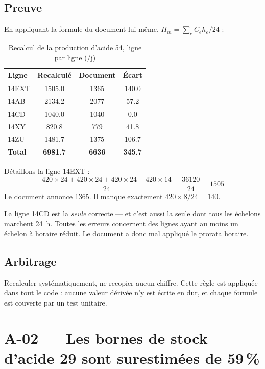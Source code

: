 \subsection{Preuve}

En appliquant la formule du document lui-même, $\Pi_m = \sum_e C_e h_e / 24$ :

\begin{table}[H]
\centering
\caption{Recalcul de la production d'acide 54, ligne par ligne (\tP/j)}
\label{tab:recalcul-p54}
\begin{tabular}{@{}lS[table-format=4.1]S[table-format=4.0]S[table-format=3.1]@{}}
\toprule
\textbf{Ligne} & {\textbf{Recalculé}} & {\textbf{Document}} & {\textbf{Écart}} \\
\midrule
14EXT & 1505.0 & 1365 & 140.0 \\
14AB  & 2134.2 & 2077 & 57.2 \\
14CD  & 1040.0 & 1040 & 0.0 \\
14XY  & 820.8  & 779  & 41.8 \\
14ZU  & 1481.7 & 1375 & 106.7 \\
\midrule
\textbf{Total} & \bfseries 6981.7 & \bfseries 6636 & \bfseries 345.7 \\
\bottomrule
\end{tabular}
\end{table}

Détaillons la ligne 14EXT :
\[
\frac{420 \times 24 + 420 \times 24 + 420 \times 24 + 420 \times 14}{24}
= \frac{\num{36120}}{24} = \num{1505}
\]
Le document annonce \num{1365}. Il manque exactement $420 \times 8/24 = 140$.

\begin{encadre}[title={Un indice révélateur}]
La ligne 14CD est la \emph{seule} correcte --- et c'est aussi la seule dont tous les
échelons marchent \SI{24}{\hour}. Toutes les erreurs concernent des lignes ayant au moins un
échelon à horaire réduit. Le document a donc mal appliqué le prorata horaire.
\end{encadre}

\subsection{Arbitrage}

Recalculer systématiquement, ne recopier aucun chiffre. Cette règle est appliquée dans tout
le code : aucune valeur dérivée n'y est écrite en dur, et chaque formule est couverte par un
test unitaire.

\section{A-02 --- Les bornes de stock d'acide 29 sont surestimées de 59\,\%}


